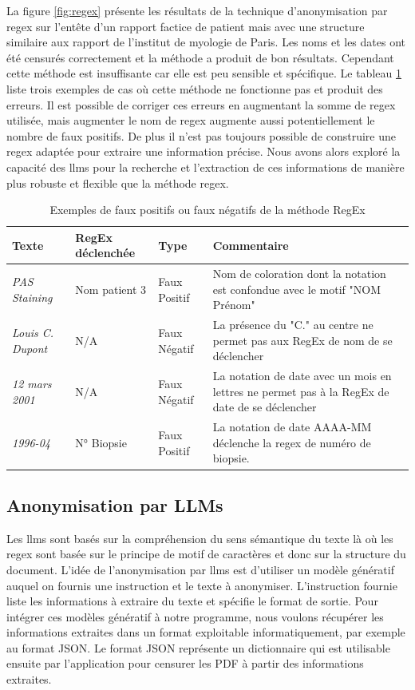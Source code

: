 La figure \ref{fig:regex} présente les résultats de la technique d'anonymisation par \gls{regex} sur l'entête d'un rapport factice de patient mais avec une structure similaire aux rapport de l'institut de myologie de Paris. Les noms et les dates ont été censurés correctement et la méthode a produit de bon résultats. Cependant cette méthode est insuffisante car elle est peu sensible et spécifique. Le tableau \ref{tab:regex_fail} liste trois exemples de cas où cette méthode ne fonctionne pas et produit des erreurs. Il est possible de corriger ces erreurs en augmentant la somme de \gls{regex} utilisée, mais augmenter le nom de \gls{regex} augmente aussi potentiellement le nombre de faux positifs. De plus il n'est pas toujours possible de construire une \gls{regex} adaptée pour extraire une information précise. Nous avons alors exploré la capacité des \gls{llms} pour la recherche et l'extraction de ces informations de manière plus robuste et flexible que la méthode \gls{regex}.
\begin{table}[htbp]
\centering
\caption{Exemples de faux positifs ou faux négatifs de la méthode RegEx}
\label{tab:regex_fail}
\begin{tabularx}{\textwidth}{|l|l|l|X|}
\hline
\textbf{Texte} & \textbf{RegEx déclenchée} & \textbf{Type} & \textbf{Commentaire} \\ \hline
\textit{PAS Staining} & Nom patient 3 & Faux Positif & Nom de coloration dont la notation est confondue avec le motif "NOM Prénom" \\ \hline
\textit{Louis C. Dupont} & N/A & Faux Négatif & La présence du "C." au centre ne permet pas aux RegEx de nom de se déclencher \\ \hline
\textit{12 mars 2001} & N/A & Faux Négatif & La notation de date avec un mois en lettres ne permet pas à la RegEx de date de se déclencher \\ \hline
\textit{1996-04} & N° Biopsie & Faux Positif & La notation de date AAAA-MM déclenche la \gls{regex} de numéro de biopsie. \\ \hline
\end{tabularx}
\end{table}

\subsection{Anonymisation par LLMs}
Les \gls{llms} sont basés sur la compréhension du sens sémantique du texte là où les \gls{regex} sont basée sur le principe de motif de caractères et donc sur la structure du document. L'idée de l'anonymisation par \gls{llms} est d'utiliser un modèle génératif auquel on fournis une instruction et le texte à anonymiser. L'instruction fournie liste les informations à extraire du texte et spécifie le format de sortie. Pour intégrer ces modèles génératif à notre programme, nous voulons récupérer les informations extraites dans un format exploitable informatiquement, par exemple au format JSON. Le format JSON représente un dictionnaire qui est utilisable ensuite par l'application pour censurer les PDF à partir des informations extraites.

